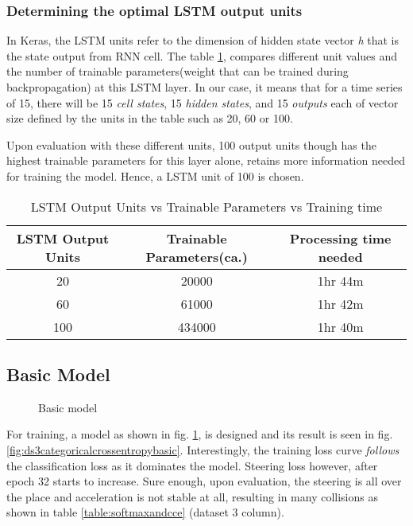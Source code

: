 \subsubsection*{Determining the optimal LSTM output units}
In Keras, the LSTM units refer to the dimension of hidden state vector \textit{h} that is the state output from RNN cell.
The table \ref{table:unitsvstime}, compares different unit values and the number of
trainable parameters(weight that can be trained during backpropagation) at this LSTM
layer.
In our case, it means that for a time series of 15, there will be 15 \textit{cell states},
15 \textit{hidden states}, and 15 \textit{outputs} each of vector size defined by the
units in the table such as 20, 60 or 100.

Upon evaluation with these different units, 100 output units though has the highest
trainable parameters for this layer alone, retains more information needed for training
the model.  Hence, a LSTM unit of 100 is chosen.
\begin{table}[t]
    \centering
\begin{tabular}{ccc}
    \toprule
    LSTM Output Units & Trainable Parameters(ca.) & Processing time needed \\\midrule
    20 & 20000 & 1hr 44m  \\
    60 & 61000 & 1hr 42m \\
    100 & 434000  & 1hr 40m \\\bottomrule
\end{tabular}
\caption{LSTM Output Units vs Trainable Parameters vs Training time}
\label{table:unitsvstime}
\end{table}
\subsection{Basic Model}
\begin{figure}[!ht]
    \centering
    \def\svgwidth{0.2\textwidth}
    \caption{Basic model}
    \label{fig:steeringbasicmodel}
\end{figure}

For training, a model as shown in fig. \ref{fig:steeringbasicmodel}, is designed and its
result is seen in fig. \ref{fig:ds3categoricalcrossentropybasic}. Interestingly, the
training loss curve \textit{follows} the classification loss as it dominates the model. Steering
loss however, after epoch 32 starts to increase. Sure enough, upon evaluation,
the steering is all over the place and acceleration is not stable at all, resulting in
many collisions as shown in table \ref{table:softmaxandcce} (dataset 3 column).

